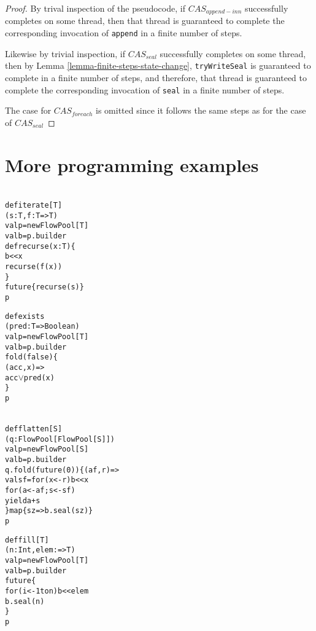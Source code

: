 \documentclass[runningheads,a4paper]{llncs}
\begin{document}
\begin{proof}

By trival inspection of the pseudocode, if $CAS_{append-inn}$ successfully
completes on some thread, then that thread is guaranteed to complete the
corresponding invocation of \verb=append= in a finite number of steps. 


Likewise by trivial inspection, if $CAS_{seal}$ successfully completes on some
thread, then by Lemma \ref{lemma-finite-steps-state-change},
\verb=tryWriteSeal= is guaranteed to complete in a finite number of steps, and
therefore, that thread is guaranteed to complete the corresponding invocation
of \verb=seal= in a finite number of steps.

The case for $CAS_{foreach}$ is omitted since it follows the same steps as for the case
of $CAS_{seal}$
\end{proof}


\section{More programming examples}



\begin{minipage}[b]{3.75 cm}
\begin{alltt}
{\scriptsize
def iterate[T]
  (s: T, f: T => T)
  val p = new FlowPool[T]
  val b = p.builder
  def recurse(x: T) \{
    b << x
    recurse(f(x))
  \}
  future \{ recurse(s) \}
  p
}
\end{alltt}
\end{minipage}
\begin{minipage}[b]{3.9 cm}
\begin{alltt}
{\scriptsize
def exists
  (pred: T => Boolean)
  val p = new FlowPool[T]
  val b = p.builder
  fold(false) \{
    (acc, x) =>
    acc \(\vee\) pred(x)
  \}
  p

}
\end{alltt}
\end{minipage}
\begin{minipage}[b]{4.7 cm}
\begin{alltt}
{\scriptsize
def flatten[S]
  (q: FlowPool[FlowPool[S]])
  val p = new FlowPool[S]
  val b = p.builder
  q.fold(future(0)) \{ (af, r) =>
    val sf = for (x <- r) b << x
    for (a <- af; s <- sf)
      yield a + s
  \} map \{ sz => b.seal(sz) \}
  p
}
\end{alltt}
\end{minipage}



\begin{minipage}[b]{4 cm}
\begin{alltt}
{\scriptsize
def fill[T]
  (n: Int, elem: =>T)
  val p = new FlowPool[T]
  val b = p.builder
  future \{
    for (i <- 1 to n) b << elem
    b.seal(n)
  \}
  p

}
\end{alltt}
\end{minipage}
 
\end{document}
